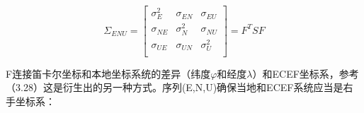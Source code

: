 		\begin{equation}\label{eq:9.28}
			\Sigma_{ENU} = 
			\begin{bmatrix}

				\sigma^2_E & \sigma_{EN} & \sigma_{EU} \\

				\sigma_{NE}& \sigma^2_N  & \sigma_{NU} \\

				\sigma_{UE}& \sigma_{UN} & \sigma^2_U \\
			\end{bmatrix}
			=F^TSF
		\end{equation} 

	F连接笛卡尔坐标和本地坐标系统的差异（纬度$\varphi$和经度$\lambda$）和ECEF坐标系，参考（3.28）这是衍生出的另一种方式。序列(E,N,U)确保当地和ECEF系统应当是右手坐标系：

